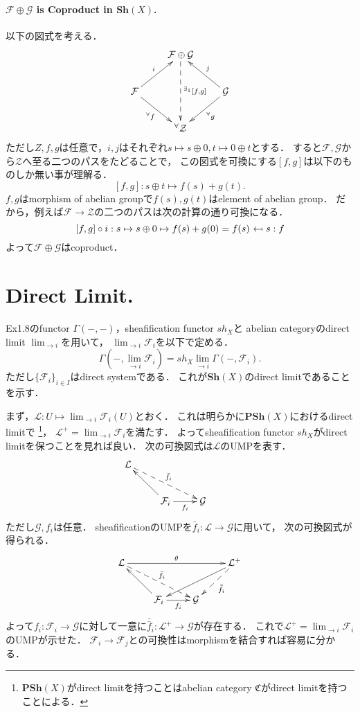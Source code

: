 \documentclass[a4paper]{jsarticle}
\newcommand{\shF}{\mathcal{F}}
\newcommand{\shG}{\mathcal{G}}
\newcommand{\shL}{\mathcal{L}}
\newcommand{\Sh}{\mathbf{Sh}}
\newcommand{\PSh}{\mathbf{PSh}}
\begin{document}
    \paragraph{$\shF \oplus \shG$ is Coproduct in $\Sh(X)$.}
    以下の図式を考える．
    \[
    \xymatrix
    {
        {} & \shF \oplus \shG \ar@{-->}[dd]^-{{}^{\exists_1} [f,g]}& {} \\
        \shF \ar[rd]_-{{}^\forall f} \ar[ru]^-{i}& {} & \shG \ar[ld]^-{{}^\forall g} \ar[lu]_-{j}\\
        {} & {}^\forall \mathcal{Z} & {}
    }
    \]
    ただし$Z,f,g$は任意で，$i, j$はそれぞれ$s \mapsto s \oplus 0, t \mapsto 0 \oplus t$とする．
    すると$\shF, \shG$から$\mathcal{Z}$へ至る二つのパスをたどることで，
    この図式を可換にする$[f,g]$は以下のものしか無い事が理解る．
    \[ [f,g]: s \oplus t \mapsto f(s)+g(t). \]
    $f,g$はmorphism of abelian groupで$f(s),g(t)$はelement of abelian group．
    だから，例えば$\shF \to \mathcal{Z}$の二つのパスは次の計算の通り可換になる．
    \[ [f,g] \circ i : s \mapsto s \oplus 0 \mapsto f(s)+g(0)=f(s) ~\mapedfrom~ s: f \]
    よって$\shF \oplus \shG$はcoproduct．

\section{Direct Limit.} %
    Ex1.8のfunctor $\Gamma(-,-)$，sheafification functor $sh_X$と
    abelian categoryのdirect limit $\lim_{\to i}$を用いて，
    $\lim_{\to i}\shF_i$を以下で定める．
    \[ \Gamma(-,\lim_{\to i}\shF_i)=sh_X \lim_{\to i} \Gamma(-,\shF_i). \]
    ただし$\{\shF_i\}_{i \in I}$はdirect systemである．
    これが$\Sh(X)$のdirect limitであることを示す．

    まず，$\shL: U \mapsto \lim_{\to i} \shF_i(U)$とおく．
    これは明らかに$\PSh(X)$におけるdirect limitで
    \footnote{$\PSh(X)$がdirect limitを持つことはabelian category $\mathfrak{C}$がdirect limitを持つことによる．}，
    $\shL^+=\lim_{\to i}\shF_i$を満たす．
    よってsheafification functor $sh_X$がdirect limitを保つことを見れば良い．
    次の可換図式は$\shL$のUMPを表す．
    \[
    \xymatrix
    {
        \shL \ar@{-->}[rrd]^-{\bar{f}_i}& {} & {} & {} \\
        {} & \shF_i \ar[r]_-{f_i} \ar[lu] & \shG & {}
    }
    \]
    ただし$\shG, f_i$は任意．
    sheafificationのUMPを$\bar{f}_i: \shL \to \shG$に用いて，
    次の可換図式が得られる．
    \[
    \xymatrix
    {
    \shL \ar@{-->}[rrd]^-{\bar{f}_i} \ar[rrr]^-{\theta}& {} & {} & \shL^+ \ar[lld] \ar@{-->}[ld]^-{\bar{\bar{f}}_i}\\
        {} & \shF_i \ar[r]_-{f_i} \ar[lu] & \shG & {}
    }
    \]
    よって$f_i:\shF_i \to \shG$に対して一意に$\bar{\bar{f}}_i: \shL^+ \to \shG$が存在する．
    これで$\shL^+=\lim_{\to i}\shF_i$のUMPが示せた．
    $\shF_i \to \shF_j$との可換性はmorphismを結合すれば容易に分かる．
\end{document}
